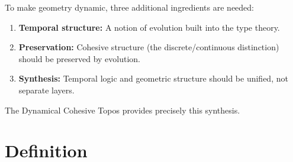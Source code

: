 \documentclass[11pt,a4paper]{article}
\theoremstyle{plain}
\theoremstyle{definition}
\theoremstyle{remark}
\begin{document}
To make geometry dynamic, three additional ingredients are needed:
\begin{enumerate}[nosep]
    \item \textbf{Temporal structure:} A notion of evolution built into the type theory.
    \item \textbf{Preservation:} Cohesive structure (the discrete/continuous distinction) should be preserved by evolution.
    \item \textbf{Synthesis:} Temporal logic and geometric structure should be unified, not separate layers.
\end{enumerate}
The Dynamical Cohesive Topos provides precisely this synthesis.

\section{Definition}
\label{sec:definition}
\end{document}
